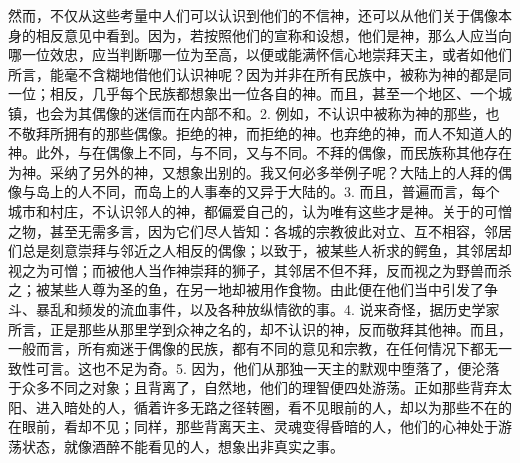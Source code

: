 然而，不仅从这些考量中人们可以认识到他们的不信神，还可以从他们关于偶像本身的相反意见中看到。因为，若按照他们的宣称和设想，他们是神，那么人应当向哪一位效忠，应当判断哪一位为至高，以便或能满怀信心地崇拜天主，或者如他们所言，能毫不含糊地借他们认识神呢？因为并非在所有民族中，被称为神的都是同一位；相反，几乎每个民族都想象出一位各自的神。而且，甚至一个地区、一个城镇，也会为其偶像的迷信而在内部不和。\newline{}2. 例如，不认识中被称为神的那些，也不敬拜所拥有的那些偶像。拒绝的神，而拒绝的神。也弃绝的神，而人不知道人的神。此外，与在偶像上不同，与不同，又与不同。不拜的偶像，而民族称其他存在为神。采纳了另外的神，又想象出别的。我又何必多举例子呢？大陆上的人拜的偶像与岛上的人不同，而岛上的人事奉的又异于大陆的。\newline{}3. 而且，普遍而言，每个城市和村庄，不认识邻人的神，都偏爱自己的，认为唯有这些才是神。关于的可憎之物，甚至无需多言，因为它们尽人皆知：各城的宗教彼此对立、互不相容，邻居们总是刻意崇拜与邻近之人相反的偶像；以致于，被某些人祈求的鳄鱼，其邻居却视之为可憎；而被他人当作神崇拜的狮子，其邻居不但不拜，反而视之为野兽而杀之；被某些人尊为圣的鱼，在另一地却被用作食物。由此便在他们当中引发了争斗、暴乱和频发的流血事件，以及各种放纵情欲的事。\newline{}4. 说来奇怪，据历史学家所言，正是那些从那里学到众神之名的，却不认识的神，反而敬拜其他神。而且，一般而言，所有痴迷于偶像的民族，都有不同的意见和宗教，在任何情况下都无一致性可言。这也不足为奇。\newline{}5. 因为，他们从那独一天主的默观中堕落了，便沦落于众多不同之对象；且背离了，自然地，他们的理智便四处游荡。正如那些背弃太阳、进入暗处的人，循着许多无路之径转圈，看不见眼前的人，却以为那些不在的在眼前，看却不见；同样，那些背离天主、灵魂变得昏暗的人，他们的心神处于游荡状态，就像酒醉不能看见的人，想象出非真实之事。\par

\par

